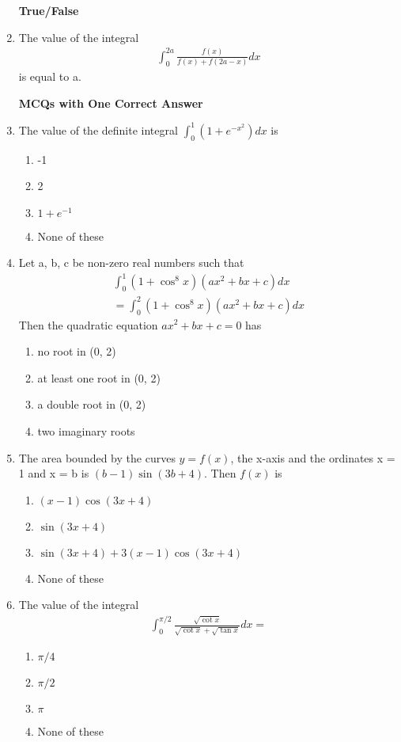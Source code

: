 \begin{enumerate}[label=\arabic*.,ref=\thesubsection.\theenumi]
\textbf{ True/False}

\item The value of the integral 
\begin{align*}
\int_{0}^{2a}\frac{f(x)}{f(x) + f(2a - x)}dx
\end{align*}
is equal to a.

\textbf{ MCQs with One Correct Answer}

\item The value of the definite integral $\int_{0}^{1}(1 + e^{-x^{2}})dx$ is
\begin{enumerate}
\item -1
\item 2
\item $1 + e^{-1}$
\item None of these
\end{enumerate} 

\item Let a, b, c be non-zero real numbers such that
\begin{align*}
\int_{0}^{1}(1+\cos^{8}x)(ax^2+bx+c)dx\\=\int_{0}^{2}(1+\cos^{8}x)(ax^2+bx+c)dx
\end{align*}
Then the quadratic equation $ax^2 + bx + c = 0$ has
\begin{enumerate}
\item no root in (0, 2)
\item at least one root in (0, 2)
\item a double root in (0, 2)
\item two imaginary roots
\end{enumerate}

\item The area bounded by the curves $y = f(x)$, the x-axis and the ordinates x = 1 and x = b is $(b - 1)\sin(3b + 4)$. Then $f(x)$ is
\begin{enumerate}
\item $(x - 1)\cos(3x + 4)$
\item $\sin(3x + 4)$
\item $\sin(3x + 4) + 3(x - 1)\cos(3x + 4)$
\item None of these
\end{enumerate}

\item The value of the integral
\begin{align*}
\int_{0}^{\pi/2}\frac{\sqrt{\cot x}}{\sqrt{\cot x} + \sqrt{\tan x}}dx = 
\end{align*}
\begin{enumerate}
\item $\pi/4$
\item $\pi/2$
\item $\pi$
\item None of these
\end{enumerate}


\end{enumerate}
